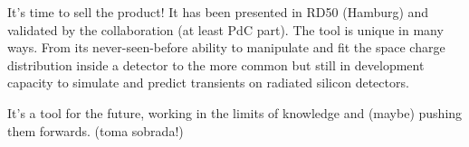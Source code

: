 It's time to sell the product! It has been presented in RD50 (Hamburg) and validated by the collaboration (at least PdC part). The tool is unique in many ways. From its never-seen-before ability to manipulate and fit the space charge distribution inside a detector to the more common but still in development capacity to simulate and predict transients on radiated silicon detectors.

It's a tool for the future, working in the limits of knowledge and (maybe) pushing them forwards. (toma sobrada!)

